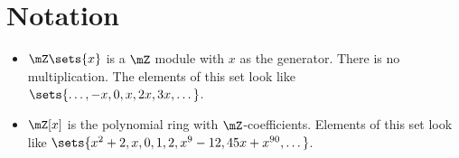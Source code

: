 \section{Notation}

\begin{multicols}{2}
    \begin{itemize}
        \item $\mZ\sets{x}$ is a $\mZ$ module with $x$ as the generator. There is no multiplication.  The elements of this set look like $\sets{\dots,-x,0,x,2x,3x,\dots}$.
        \item $\mZ[x]$ is the polynomial ring with $\mZ$-coefficients. Elements of this set look like $\sets{x^2+2,x,0,1,2,x^9-12,45x+x^{90},\dots}$. 
    \end{itemize}
\end{multicols}